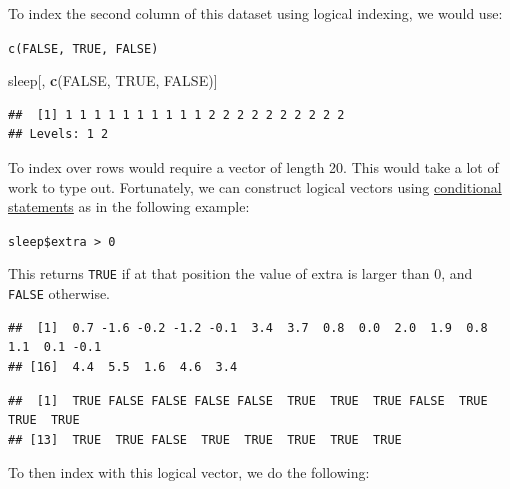 \documentclass[
]{book}
\newenvironment{Shaded}{\begin{snugshade}}{\end{snugshade}}
\newcommand{\ConstantTok}[1]{\textcolor[rgb]{0.56,0.35,0.01}{#1}}
\newcommand{\DecValTok}[1]{\textcolor[rgb]{0.00,0.00,0.81}{#1}}
\newcommand{\FunctionTok}[1]{\textcolor[rgb]{0.13,0.29,0.53}{\textbf{#1}}}
\newcommand{\NormalTok}[1]{#1}
\newcommand{\SpecialCharTok}[1]{\textcolor[rgb]{0.81,0.36,0.00}{\textbf{#1}}}
\begin{document}
To index the second column of this dataset using logical indexing, we would use:

\texttt{c(FALSE,\ TRUE,\ FALSE)}

\begin{Shaded}
\begin{Highlighting}[]
\NormalTok{sleep[, }\FunctionTok{c}\NormalTok{(}\ConstantTok{FALSE}\NormalTok{, }\ConstantTok{TRUE}\NormalTok{, }\ConstantTok{FALSE}\NormalTok{)]}
\end{Highlighting}
\end{Shaded}

\begin{verbatim}
##  [1] 1 1 1 1 1 1 1 1 1 1 2 2 2 2 2 2 2 2 2 2
## Levels: 1 2
\end{verbatim}

To index over rows would require a vector of length 20. This would take a lot of work to type out. Fortunately, we can construct logical vectors using \ul{conditional statements} as in the following example:

\texttt{sleep\$extra\ \textgreater{}\ 0}

This returns \texttt{TRUE} if at that position the value of extra is larger than 0, and \texttt{FALSE} otherwise.

\begin{Shaded}
\end{Shaded}

\begin{verbatim}
##  [1]  0.7 -1.6 -0.2 -1.2 -0.1  3.4  3.7  0.8  0.0  2.0  1.9  0.8  1.1  0.1 -0.1
## [16]  4.4  5.5  1.6  4.6  3.4
\end{verbatim}

\begin{Shaded}
\end{Shaded}

\begin{verbatim}
##  [1]  TRUE FALSE FALSE FALSE FALSE  TRUE  TRUE  TRUE FALSE  TRUE  TRUE  TRUE
## [13]  TRUE  TRUE FALSE  TRUE  TRUE  TRUE  TRUE  TRUE
\end{verbatim}

To then index with this logical vector, we do the following:
\end{document}

